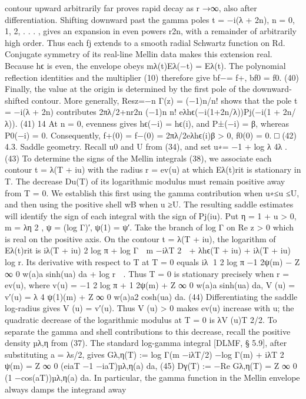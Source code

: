 contour upward arbitrarily far proves rapid decay as r →∞, also after diﬀerentiation. Shifting
downward past the gamma poles
t = −i(λ + 2n),
n = 0, 1, 2, . . . ,
gives an expansion in even powers r2n, with a remainder of arbitrarily high order. Thus each
fj extends to a smooth radial Schwartz function on Rd. Conjugate symmetry of its real-line
Mellin data makes this extension real.
Because hϵ is even, the envelope obeys mλ(t)Eλ(−t) = Eλ(t). The polynomial reﬂection
identities and the multiplier (10) therefore give
bf−= f+,
bf0 = f0.
(40)
Finally, the value at the origin is determined by the ﬁrst pole of the downward-shifted contour.
More generally, Resz=−n Γ(z) = (−1)n/n! shows that the pole t = −i(λ + 2n) contributes
2πλ/2+nr2n (−1)n
n!
eλhϵ(−i(1+2n/λ))Pj(−i(1 + 2n/λ)).
(41)
14
At n = 0, evenness gives hϵ(−i) = hϵ(i), and P±(−i) = β, whereas P0(−i) = 0. Consequently,
f+(0) = f−(0) = 2πλ/2eλhϵ(i)β > 0,
f0(0) = 0.
□
(42)
4.3. Saddle geometry. Recall u0 and U from (34), and set
u∗= −1 + log λ
4λ .
(43)
To determine the signs of the Mellin integrals (38), we associate each contour t = λ(T + iu)
with the radius r = ev(u) at which Eλ(t)rit is stationary in T.
The decrease Du(T) of its
logarithmic modulus must remain positive away from T = 0. We establish this ﬁrst using the
gamma contribution when u∗≤u ≤U, and then using the positive shell wB when u ≥U. The
resulting saddle estimates will identify the sign of each integral with the sign of Pj(iu).
Put
η = 1 + u > 0,
m = λη
2 ,
ψ = (log Γ)′,
ψ(1) = ψ′.
Take the branch of log Γ on Re z > 0 which is real on the positive axis.
On the contour
t = λ(T + iu), the logarithm of Eλ(t)rit is
iλ(T + iu)
2
log π + log Γ

m −iλT
2

+ λhϵ(T + iu) + iλ(T + iu) log r.
Its derivative with respect to T at T = 0 equals
iλ
1
2 log π −1
2ψ(m) −
Z ∞
0
w(a)a sinh(ua) da + log r

.
Thus T = 0 is stationary precisely when r = ev(u), where
v(u) = −1
2 log π + 1
2ψ(m) +
Z ∞
0
w(a)a sinh(ua) da,
V (u) = v′(u) = λ
4 ψ(1)(m) +
Z ∞
0
w(a)a2 cosh(ua) da.
(44)
Diﬀerentiating the saddle log-radius gives V (u) = v′(u). Thus V (u) > 0 makes ev(u) increase
with u; the quadratic decrease of the logarithmic modulus at T = 0 is λV (u)T 2/2.
To separate the gamma and shell contributions to this decrease, recall the positive density
µλ,η from (37). The standard log-gamma integral [DLMF, § 5.9], after substituting a = λs/2,
gives
Gλ,η(T) := log Γ(m −iλT/2) −log Γ(m) + iλT
2 ψ(m)
=
Z ∞
0
(eiaT −1 −iaT)µλ,η(a) da,
(45)
Dγ(T) := −Re Gλ,η(T) =
Z ∞
0
(1 −cos(aT))µλ,η(a) da.
In particular, the gamma function in the Mellin envelope always damps the integrand away
